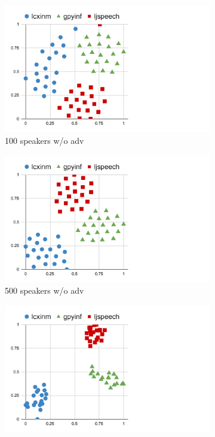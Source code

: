 \begin{figure}[!ht]
    \begin{minipage}[b]{\linewidth}
        \begin{subfigure}[b]{0.33\linewidth}
            \centering
            \includegraphics[width=\linewidth,trim=0 0 200 0,clip]{figure/5_dvector11.pdf}
            \caption{100 speakers w/o adv}
        \end{subfigure}        
        \begin{subfigure}[b]{0.33\linewidth}
            \centering
            \includegraphics[width=\linewidth,trim=0 0 200 0,clip]{figure/5_dvector12.pdf}
            \caption{500 speakers w/o adv}
        \end{subfigure}   
        \begin{subfigure}[b]{0.33\linewidth}
            \centering
            \includegraphics[width=\linewidth,trim=0 0 200 0,clip]{figure/5_dvector13.pdf}

\end{subfigure}
\end{minipage}
\end{figure}
